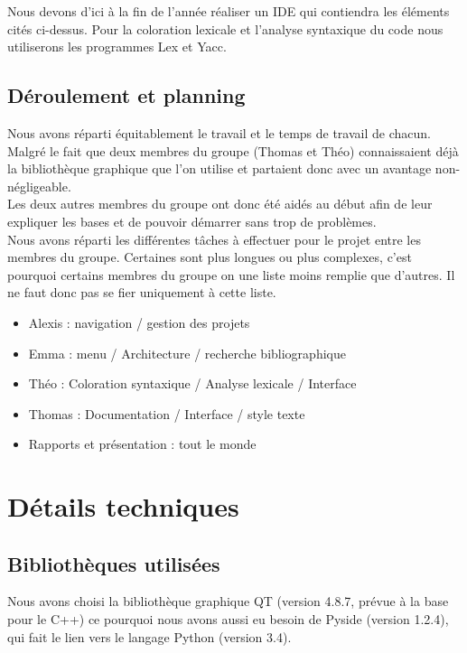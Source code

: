 \documentclass[a4paper,12pt]{article}
\begin{document}
	Nous devons d'ici à la fin de l'année réaliser un IDE qui contiendra les éléments cités ci-dessus. Pour la coloration lexicale et l'analyse syntaxique du code nous utiliserons les programmes Lex et Yacc.
	
	\subsection{Déroulement et planning}
	
	Nous avons réparti équitablement le travail et le temps de travail de chacun. Malgré le fait que deux membres du groupe (Thomas et Théo) connaissaient déjà la bibliothèque graphique que l'on utilise et partaient donc avec un avantage non-négligeable. \\
	Les deux autres membres du groupe ont donc été aidés au début afin de leur expliquer les bases et de pouvoir démarrer sans trop de problèmes.\\
	
	Nous avons réparti les différentes tâches à effectuer pour le projet entre les membres du groupe. Certaines sont plus longues ou plus complexes, c'est pourquoi certains membres du groupe on une liste moins remplie que d'autres. Il ne faut donc pas se fier uniquement à cette liste.\\
	
	\begin{itemize}
		\item Alexis : navigation / gestion des projets
		\item Emma : menu / Architecture / recherche bibliographique
		\item Théo : Coloration syntaxique / Analyse lexicale / Interface
		\item Thomas : Documentation / Interface / style texte
		\item Rapports et présentation : tout le monde 
	\end{itemize}
	
\section{Détails techniques}

	\subsection{Bibliothèques utilisées}
	
	Nous avons choisi la bibliothèque graphique QT (version 4.8.7, prévue à la base pour le C++) ce pourquoi nous avons aussi eu besoin de Pyside (version 1.2.4), qui fait le lien vers le langage Python (version 3.4).\\
	
\end{document}
